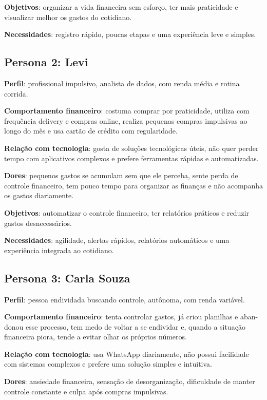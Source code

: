 \textbf{Objetivos}: organizar a vida financeira sem esforço, ter mais praticidade e visualizar melhor os gastos do cotidiano.

\textbf{Necessidades}: registro rápido, poucas etapas e uma experiência leve e simples.

\subsection{Persona 2: Levi}

\textbf{Perfil}: profissional impulsivo, analista de dados, com renda média e rotina corrida.

\textbf{Comportamento financeiro}: costuma comprar por praticidade, utiliza com frequência delivery e compras online, realiza pequenas compras impulsivas ao longo do mês e usa cartão de crédito com regularidade.

\textbf{Relação com tecnologia}: gosta de soluções tecnológicas úteis, não quer perder tempo com aplicativos complexos e prefere ferramentas rápidas e automatizadas.

\textbf{Dores}: pequenos gastos se acumulam sem que ele perceba, sente perda de controle financeiro, tem pouco tempo para organizar as finanças e não acompanha os gastos diariamente.

\textbf{Objetivos}: automatizar o controle financeiro, ter relatórios práticos e reduzir gastos desnecessários.

\textbf{Necessidades}: agilidade, alertas rápidos, relatórios automáticos e uma experiência integrada ao cotidiano.

\subsection{Persona 3: Carla Souza}

\textbf{Perfil}: pessoa endividada buscando controle, autônoma, com renda variável.

\textbf{Comportamento financeiro}: tenta controlar gastos, já criou planilhas e aban-donou esse processo, tem medo de voltar a se endividar e, quando a situação financeira piora, tende a evitar olhar os próprios números.

\textbf{Relação com tecnologia}: usa WhatsApp diariamente, não possui facilidade com sistemas complexos e prefere uma solução simples e intuitiva.

\textbf{Dores}: ansiedade financeira, sensação de desorganização, dificuldade de manter controle constante e culpa após compras impulsivas.

